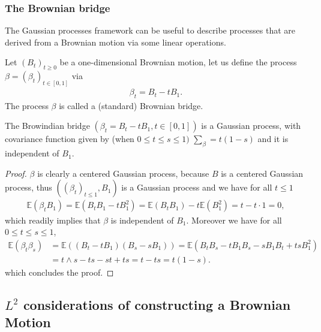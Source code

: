 \documentclass[../mainfile.tex]{subfiles}
\begin{document}
\subsubsection{The Brownian bridge}
The Gaussian processes framework can be useful to describe processes that are derived from a Brownian motion via some linear operations. 
\begin{defn} Let $(B_t)_{t \geq 0}$ be a one-dimensional Brownian motion, let us define the process $\beta = (\beta_t)_{t \in [0,1]}$ via 
\begin{align*}
\beta_t= B_t-tB_1.
\end{align*}
The process $\beta$ is called a (standard) Brownian bridge.
\end{defn}
\begin{prop} The Browindian bridge $(\beta_t= B_t-tB_1, t \in [0,1])$ is a Gaussian process, with covariance function given by (when $0 \leq t \leq s \leq 1)$ $\sum_\beta = t(1-s)$ and it is independent of $B_1$. 
\end{prop}
\begin{proof}
$\beta$ is clearly a centered Gaussian process, because $B$ is a centered Gaussian process, thus $(( \beta_t)_{t \leq 1}, B_1)$ is a Gaussian process and we have for all $t \leq 1$
\begin{align*}
\mathbb{E}( \beta_t B_1)= \mathbb{E}(B_tB_1 - t B_1^2)= \mathbb{E}(B_tB_1)-t\mathbb{E}(B_1^2)=t-t \cdot 1=0,
\end{align*}
which readily implies that $\beta$ is independent of $B_1$. Moreover we have for all $0 \leq t \leq s \leq 1$,
\begin{align*}
\mathbb{E}( \beta_t \beta_s)&= \mathbb{E}((B_t-tB_1)(B_s-sB_1)) = \mathbb{E}(B_tB_s-tB_1B_s-sB_1B_t+tsB_1^2) \\
&=t \wedge s  - ts-st+ts= t-ts=t(1-s).
\end{align*}
which concludes the proof.
\end{proof}
\newpage
\subsection{$L^2$ considerations of constructing a Brownian Motion}
\end{document}
